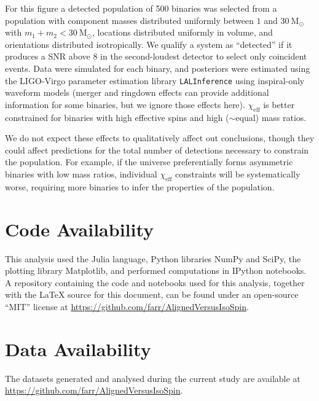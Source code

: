 \documentclass{nature-arxiv}
\newcommand{\chieff}{\chi_\mathrm{eff}}
\newcounter{mainbib}
\begin{document}
\begin{methods}
For this figure a detected population of 500 binaries was selected
from a population with component masses distributed uniformly between
$1$ and $30~\mathrm{M}_\odot$ with $m_1 + m_2 < 30~\mathrm{M}_\odot$,
locations distributed uniformly in volume, and orientations
distributed isotropically.  We qualify a system as ``detected'' if it
produces a SNR above $8$ in the second-loudest detector to select only
coincident events.  Data were simulated for each binary, and
posteriors were estimated using the LIGO-Virgo parameter estimation
library \texttt{LALInference}\cite{2015PhRvD..91d2003V} using
inspiral-only waveform models (merger and ringdown effects can provide
additional information for some binaries, but we ignore those effects
here).  $\chieff$ is better constrained for binaries with high
effective spins and high ($\sim$equal) mass ratios.

We do not expect these effects to qualitatively affect
out conclusions, though they could affect predictions for the total
number of detections necessary to constrain the population.  For
example, if the universe preferentially forms asymmetric binaries with
low mass ratios, individual $\chieff$ constraints will be systematically
worse, requiring more binaries to infer the properties
of the population.

\section{Code Availability}

This analysis used the Julia language\cite{Julia}, Python libraries
NumPy and SciPy\cite{NumPy,SciPy}, the plotting library
Matplotlib\cite{Matplotlib}, and performed computations in IPython
notebooks\cite{IPython}.  A repository containing the code and
notebooks used for this analysis, together with the \LaTeX{} source
for this document, can be found under an open-source ``MIT'' license
at \url{https://github.com/farr/AlignedVersusIsoSpin}.

\section{Data Availability}

The datasets generated and analysed during the current study are
available at \url{https://github.com/farr/AlignedVersusIsoSpin}.

\begin{thebibliography}{10}
\setcounter{enumiv}{\value{mainbib}}


\end{thebibliography}
\end{methods}
\end{document}
